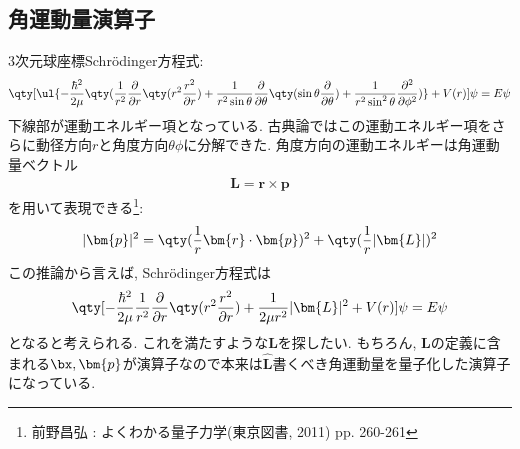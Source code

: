 \documentclass[10.5pt,a4paper]{jreport}
\begin{document}
\subsection{角運動量演算子}
3次元球座標Schr\"odinger方程式:
\begin{eqnarray}
  \qty[\ul{-\frac{\hbar^2}{2\mu}\qty(\frac{1}{r^2}\frac{\partial}{\partial r}\qty(r^2\frac{r^2}{\partial r}) + \frac{1}{r^2\sin{\theta}}\frac{\partial}{\partial \theta}\qty(\sin{\theta}\frac{\partial}{\partial \theta}) + \frac{1}{r^2\sin^2{\theta}}\frac{\partial^2}{\partial \phi^2})} + V(r)]\psi = E\psi
\end{eqnarray}
下線部が運動エネルギー項となっている. 古典論ではこの運動エネルギー項をさらに動径方向$r$と角度方向$\theta\phi$に分解できた. 角度方向の運動エネルギーは角運動量ベクトル
\begin{eqnarray}
  \bm{L} = \bm{r}\times\bm{p}
\end{eqnarray}
を用いて表現できる\footnote{前野昌弘 : よくわかる量子力学(東京図書, 2011) pp. 260-261}:
\begin{eqnarray}
  |\bm{p}|^2 = \qty(\frac{1}{r}\bm{r}\cdot\bm{p})^2 + \qty(\frac{1}{r}|\bm{L}|)^2
\end{eqnarray}
この推論から言えば, Schr\"odinger方程式は
\begin{eqnarray}
  \qty[-\frac{\hbar^2}{2\mu}\frac{1}{r^2}\frac{\partial}{\partial r}\qty(r^2\frac{r^2}{\partial r}) + \frac{1}{2\mu r^2}|\bm{L}|^2  + V(r)]\psi = E\psi
\end{eqnarray}
となると考えられる. これを満たすような$\bm{L}$を探したい. もちろん, $\bm{L}$の定義に含まれる$\bx, \bm{p}$が演算子なので本来は$\hat{\bm{L}}$書くべき角運動量を量子化した演算子になっている.
\end{document}
